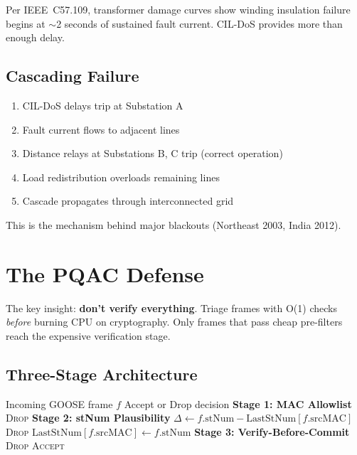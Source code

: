 \documentclass[11pt,a4paper,twocolumn]{article}
\begin{document}
Per IEEE~C57.109, transformer damage curves show winding insulation failure begins at $\sim$2 seconds of sustained fault current. CIL-DoS provides more than enough delay.

\subsection{Cascading Failure}

\begin{enumerate}[leftmargin=1.5em,itemsep=1pt]
\item CIL-DoS delays trip at Substation A
\item Fault current flows to adjacent lines
\item Distance relays at Substations B, C trip (correct operation)
\item Load redistribution overloads remaining lines
\item Cascade propagates through interconnected grid
\end{enumerate}

This is the mechanism behind major blackouts (Northeast 2003, India 2012).

\section{The PQAC Defense}
\label{sec:defense}

\begin{defensebox}
The key insight: \textbf{don't verify everything}. Triage frames with O(1) checks \emph{before} burning CPU on cryptography. Only frames that pass cheap pre-filters reach the expensive verification stage.
\end{defensebox}

\subsection{Three-Stage Architecture}

\begin{algorithm}[H]
\caption{PQAC: Priority Queue Admission Controller}
\begin{algorithmic}[1]
\Require Incoming GOOSE frame $f$
\Ensure Accept or Drop decision
\State \textbf{Stage 1: MAC Allowlist} 
    \State \Return \textsc{Drop} 
\EndIf
\State
\State \textbf{Stage 2: stNum Plausibility} 
\State $\Delta \gets f.\text{stNum} - \text{LastStNum}[f.\text{srcMAC}]$
 
    \State \Return \textsc{Drop} 
\EndIf
\State $\text{LastStNum}[f.\text{srcMAC}] \gets f.\text{stNum}$
\State
\State \textbf{Stage 3: Verify-Before-Commit} 
    \State \Return \textsc{Drop}
\EndIf
\State \Return \textsc{Accept} 
\end{algorithmic}
\end{algorithm}
\end{document}
